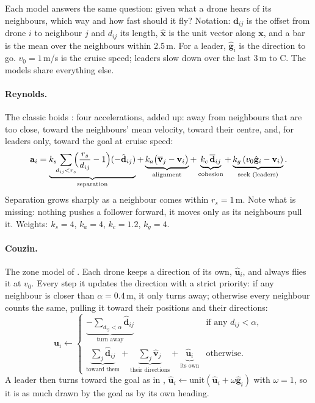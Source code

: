 Each model answers the same question: given what a drone hears of its
neighbours, which way and how fast should it fly? Notation: $\mathbf d_{ij}$
is the offset from drone $i$ to neighbour $j$ and $d_{ij}$ its length,
$\hat{\mathbf x}$ is the unit vector along $\mathbf x$, and a bar is the mean
over the neighbours within 2.5\,m. For a leader, $\hat{\mathbf g}_i$ is the
direction to go. $v_0 = 1$\,m/s is the cruise speed; leaders slow down over
the last 3\,m to C. The models share everything else.

\paragraph{Reynolds.} The classic boids \citep{reynolds1987}: four
accelerations, added up: away from neighbours that
are too close, toward the neighbours' mean velocity, toward their centre,
and, for leaders only, toward the goal at cruise speed:
\begin{equation}
  \mathbf a_i =
  \underbrace{k_s \!\!\sum_{d_{ij} < r_s}\!\! \Bigl(\frac{r_s}{d_{ij}} - 1\Bigr)(-\hat{\mathbf d}_{ij})}_{\text{separation}}
  + \underbrace{k_a \bigl(\overline{\mathbf v}_j - \mathbf v_i\bigr)}_{\text{alignment}}
  + \underbrace{k_c\, \overline{\mathbf d}_{ij}}_{\text{cohesion}}
  + \underbrace{k_g\,(v_0 \hat{\mathbf g}_i - \mathbf v_i)}_{\text{seek (leaders)}}.
\end{equation}
Separation grows sharply as a neighbour comes within $r_s = 1$\,m. Note what
is missing: nothing pushes a follower forward, it moves only as its
neighbours pull it. Weights: $k_s = 4$, $k_a = 4$, $k_c = 1.2$, $k_g = 4$.

\paragraph{Couzin.} The zone model of \citet{couzin2002}. Each drone keeps a
direction of its own,
$\hat{\mathbf u}_i$, and always flies it at $v_0$. Every step it updates the
direction with a strict priority: if any neighbour is closer than
$\alpha = 0.4$\,m, it only turns away; otherwise every neighbour counts the
same, pulling it toward their positions and their directions:
\begin{equation}
  \mathbf u_i \leftarrow
  \begin{cases}
    \underbrace{-\textstyle\sum_{d_{ij} < \alpha} \hat{\mathbf d}_{ij}}_{\text{turn away}}
      & \text{if any } d_{ij} < \alpha,\\[12pt]
    \underbrace{\textstyle\sum_{j} \hat{\mathbf d}_{ij}}_{\text{toward them}}
      + \underbrace{\textstyle\sum_{j} \hat{\mathbf v}_j}_{\text{their directions}}
      + \underbrace{\hat{\mathbf u}_i}_{\text{its own}}
      & \text{otherwise.}
  \end{cases}
\end{equation}
A leader then turns toward the goal as in \citet{couzin2005},
$\hat{\mathbf u}_i \leftarrow
\mathrm{unit}(\hat{\mathbf u}_i + \omega \hat{\mathbf g}_i)$ with
$\omega = 1$, so it is as much drawn by the goal as by its own heading.

